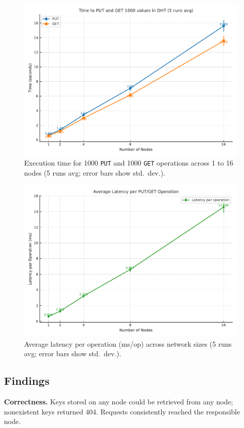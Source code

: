 \documentclass[conference]{IEEEtran}
\begin{document}
\begin{figure}[t]
  \centering
  \includegraphics[width=0.95\columnwidth]{throughput.pdf}
  \caption{Execution time for 1000 \texttt{PUT} and 1000 \texttt{GET} operations across 1 to 16 nodes (5 runs avg; error bars show std.\ dev.).}
  \label{fig:time}
\end{figure}

\begin{figure}[t]
  \centering
  \includegraphics[width=0.95\columnwidth]{latency.pdf}
  \caption{Average latency per operation (ms/op) across network sizes (5 runs avg; error bars show std.\ dev.).}
  \label{fig:latency}
\end{figure}

\subsection{Findings}
\textbf{Correctness.} Keys stored on any node could be retrieved from any node; nonexistent keys returned 404. Requests consistently reached the responsible node.  
\end{document}
